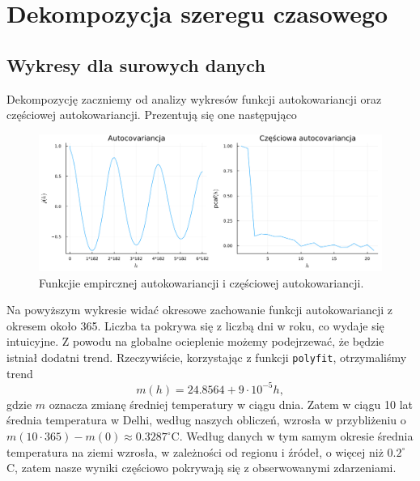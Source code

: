 \documentclass[12pt]{article}
\theoremstyle{exer}
\begin{document}
	
	\section{Dekompozycja szeregu czasowego}
	\subsection{Wykresy dla surowych danych}
	Dekompozycję zaczniemy od analizy wykresów funkcji autokowariancji oraz częściowej autokowariancji. Prezentują się one następująco
	\begin{figure}[H]\label{fig:dry_cov}
		\includegraphics[width=\columnwidth]{Budnik/img/auto_dry.png}
		\caption{Funkcjie empircznej autokowariancji i częściowej autokowariancji.}
	\end{figure}
	Na powyższym wykresie widać okresowe zachowanie funkcji autokowariancji z okresem około 365. Liczba ta pokrywa się z liczbą dni w roku, co wydaje się intuicyjne. Z powodu na globalne ocieplenie możemy podejrzewać, że będzie istniał dodatni trend. Rzeczywiście, korzystając z funkcji \verb*|polyfit|, otrzymaliśmy trend
	\begin{equation}
		m(h)=24.8564+9\cdot10^{-5}h,
	\end{equation}  
	gdzie $m$ oznacza zmianę średniej temperatury w ciągu dnia. Zatem w ciągu 10 lat średnia temperatura w Delhi, według naszych obliczeń, wzrosła w przybliżeniu o $m(10\cdot365)-m(0)\approx0.3287^\circ$C. Według danych w tym samym okresie średnia temperatura na ziemi wzrosła, w zależności od regionu i źródeł, o więcej niż $0.2^\circ$C, zatem nasze wyniki częściowo pokrywają się z obserwowanymi zdarzeniami.
\end{document}
